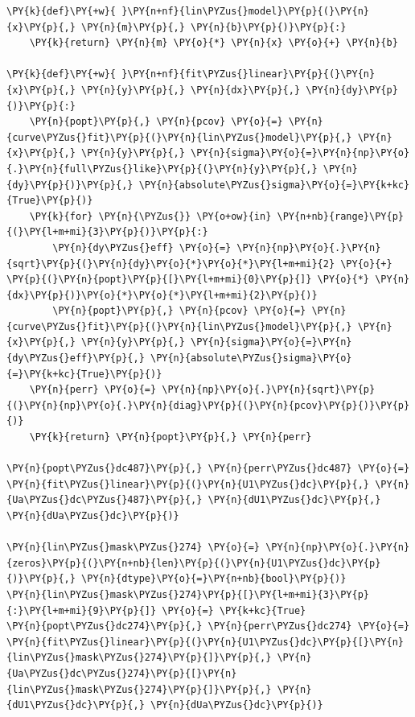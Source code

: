     \begin{tcolorbox}[breakable, size=fbox, boxrule=1pt, pad at break*=1mm,colback=cellbackground, colframe=cellborder]
\begin{Verbatim}[commandchars=\\\{\}]
\PY{k}{def}\PY{+w}{ }\PY{n+nf}{lin\PYZus{}model}\PY{p}{(}\PY{n}{x}\PY{p}{,} \PY{n}{m}\PY{p}{,} \PY{n}{b}\PY{p}{)}\PY{p}{:}
    \PY{k}{return} \PY{n}{m} \PY{o}{*} \PY{n}{x} \PY{o}{+} \PY{n}{b}

\PY{k}{def}\PY{+w}{ }\PY{n+nf}{fit\PYZus{}linear}\PY{p}{(}\PY{n}{x}\PY{p}{,} \PY{n}{y}\PY{p}{,} \PY{n}{dx}\PY{p}{,} \PY{n}{dy}\PY{p}{)}\PY{p}{:}
    \PY{n}{popt}\PY{p}{,} \PY{n}{pcov} \PY{o}{=} \PY{n}{curve\PYZus{}fit}\PY{p}{(}\PY{n}{lin\PYZus{}model}\PY{p}{,} \PY{n}{x}\PY{p}{,} \PY{n}{y}\PY{p}{,} \PY{n}{sigma}\PY{o}{=}\PY{n}{np}\PY{o}{.}\PY{n}{full\PYZus{}like}\PY{p}{(}\PY{n}{y}\PY{p}{,} \PY{n}{dy}\PY{p}{)}\PY{p}{,} \PY{n}{absolute\PYZus{}sigma}\PY{o}{=}\PY{k+kc}{True}\PY{p}{)}
    \PY{k}{for} \PY{n}{\PYZus{}} \PY{o+ow}{in} \PY{n+nb}{range}\PY{p}{(}\PY{l+m+mi}{3}\PY{p}{)}\PY{p}{:}
        \PY{n}{dy\PYZus{}eff} \PY{o}{=} \PY{n}{np}\PY{o}{.}\PY{n}{sqrt}\PY{p}{(}\PY{n}{dy}\PY{o}{*}\PY{o}{*}\PY{l+m+mi}{2} \PY{o}{+} \PY{p}{(}\PY{n}{popt}\PY{p}{[}\PY{l+m+mi}{0}\PY{p}{]} \PY{o}{*} \PY{n}{dx}\PY{p}{)}\PY{o}{*}\PY{o}{*}\PY{l+m+mi}{2}\PY{p}{)}
        \PY{n}{popt}\PY{p}{,} \PY{n}{pcov} \PY{o}{=} \PY{n}{curve\PYZus{}fit}\PY{p}{(}\PY{n}{lin\PYZus{}model}\PY{p}{,} \PY{n}{x}\PY{p}{,} \PY{n}{y}\PY{p}{,} \PY{n}{sigma}\PY{o}{=}\PY{n}{dy\PYZus{}eff}\PY{p}{,} \PY{n}{absolute\PYZus{}sigma}\PY{o}{=}\PY{k+kc}{True}\PY{p}{)}
    \PY{n}{perr} \PY{o}{=} \PY{n}{np}\PY{o}{.}\PY{n}{sqrt}\PY{p}{(}\PY{n}{np}\PY{o}{.}\PY{n}{diag}\PY{p}{(}\PY{n}{pcov}\PY{p}{)}\PY{p}{)}
    \PY{k}{return} \PY{n}{popt}\PY{p}{,} \PY{n}{perr}

\PY{n}{popt\PYZus{}dc487}\PY{p}{,} \PY{n}{perr\PYZus{}dc487} \PY{o}{=} \PY{n}{fit\PYZus{}linear}\PY{p}{(}\PY{n}{U1\PYZus{}dc}\PY{p}{,} \PY{n}{Ua\PYZus{}dc\PYZus{}487}\PY{p}{,} \PY{n}{dU1\PYZus{}dc}\PY{p}{,} \PY{n}{dUa\PYZus{}dc}\PY{p}{)}

\PY{n}{lin\PYZus{}mask\PYZus{}274} \PY{o}{=} \PY{n}{np}\PY{o}{.}\PY{n}{zeros}\PY{p}{(}\PY{n+nb}{len}\PY{p}{(}\PY{n}{U1\PYZus{}dc}\PY{p}{)}\PY{p}{,} \PY{n}{dtype}\PY{o}{=}\PY{n+nb}{bool}\PY{p}{)}
\PY{n}{lin\PYZus{}mask\PYZus{}274}\PY{p}{[}\PY{l+m+mi}{3}\PY{p}{:}\PY{l+m+mi}{9}\PY{p}{]} \PY{o}{=} \PY{k+kc}{True}
\PY{n}{popt\PYZus{}dc274}\PY{p}{,} \PY{n}{perr\PYZus{}dc274} \PY{o}{=} \PY{n}{fit\PYZus{}linear}\PY{p}{(}\PY{n}{U1\PYZus{}dc}\PY{p}{[}\PY{n}{lin\PYZus{}mask\PYZus{}274}\PY{p}{]}\PY{p}{,} \PY{n}{Ua\PYZus{}dc\PYZus{}274}\PY{p}{[}\PY{n}{lin\PYZus{}mask\PYZus{}274}\PY{p}{]}\PY{p}{,} \PY{n}{dU1\PYZus{}dc}\PY{p}{,} \PY{n}{dUa\PYZus{}dc}\PY{p}{)}


\end{Verbatim}
\end{tcolorbox}
